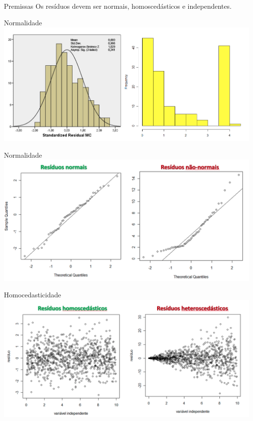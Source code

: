 \documentclass[
  9pt,
  ignorenonframetext,
  aspectratio=169]{beamer}
\begin{document}
\begin{frame}{Premissas}
\protect\hypertarget{premissas}{}
Os resíduos devem ser normais, homoscedásticos e independentes.
\end{frame}

\begin{frame}{Normalidade}
\protect\hypertarget{normalidade}{}
\includegraphics{imgs/norm1.png}
\end{frame}

\begin{frame}{Normalidade}
\protect\hypertarget{normalidade-1}{}
\includegraphics{imgs/norm2.png}
\end{frame}

\begin{frame}{Homocedasticidade}
\protect\hypertarget{homocedasticidade}{}
\includegraphics{imgs/homoc.png}
\end{frame}
\end{document}
